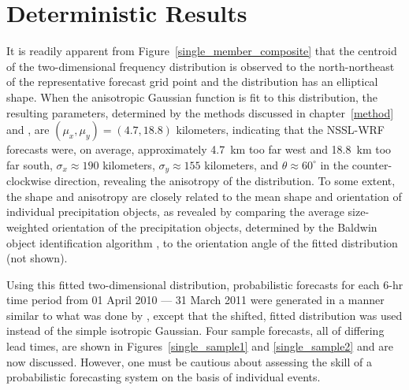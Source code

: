 

\section{Deterministic Results}
\label{dresults}

It is readily apparent from \mbox{Figure \ref{single_member_composite}} that the centroid of the two-dimensional frequency distribution is observed to the north-northeast of the representative forecast grid point and the distribution has an elliptical shape. When the anisotropic Gaussian function is fit to this distribution, the resulting parameters, determined by the methods discussed in \mbox{chapter \ref{method}} and \cite{Lak2010}, are $(\mu_x, \mu_y) = (4.7, 18.8)$ kilometers, indicating that the NSSL-WRF forecasts were, on average, approximately \mbox{4.7 km} too far west and \mbox{18.8 km} too far south, $\sigma_x \approx 190$ kilometers, $\sigma_y \approx 155$ kilometers, and $\theta \approx 60^{\circ}$ in the counter-clockwise direction, revealing the anisotropy of the distribution. To some extent, the shape and anisotropy are closely related to the mean shape and orientation of individual precipitation objects, as revealed by comparing the average size-weighted orientation of the precipitation objects, determined by the Baldwin object identification algorithm \citep{Baldwin2005}, to the orientation angle of the fitted distribution (not shown).

Using this fitted two-dimensional distribution, probabilistic forecasts for each \mbox{6-hr} time period from 01 April 2010 --- 31 March 2011 were generated in a manner similar to what was done by \cite{Sobash2011}, except that the shifted, fitted distribution was used instead of the simple isotropic Gaussian. Four sample forecasts, all of differing lead times, are shown in \mbox{Figures \ref{single_sample1}} and \ref{single_sample2} and are now discussed. However, one must be cautious about assessing the skill of a probabilistic forecasting system on the basis of individual events.

